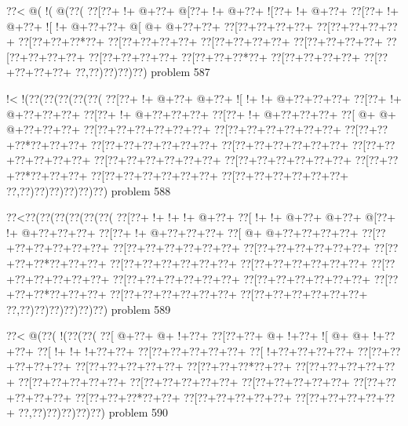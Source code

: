 \vbox{\vbox{\goo
\0??<\- @(\- !(\- @(\0??(
\0??[\0??+\- !+\- @+\0??+
\- @[\0??+\- !+\- @+\0??+
\- ![\0??+\- !+\- @+\0??+
\0??[\0??+\- !+\- @+\0??+
\- ![\- !+\- @+\0??+\0??+
\- @[\- @+\- @+\0??+\0??+
\0??[\0??+\0??+\0??+\0??+
\0??[\0??+\0??+\0??+\0??+
\0??[\0??+\0??+\0??*\0??+
\0??[\0??+\0??+\0??+\0??+
\0??[\0??+\0??+\0??+\0??+
\0??[\0??+\0??+\0??+\0??+
\0??[\0??+\0??+\0??+\0??+
\0??[\0??+\0??+\0??+\0??+
\0??[\0??+\0??+\0??*\0??+
\0??[\0??+\0??+\0??+\0??+
\0??[\0??+\0??+\0??+\0??+
\0??,\0??)\0??)\0??)\0??)
}
\hfil problem 587\hfil\break
}

\vbox{\vbox{\goo
\- !<\- !(\0??(\0??(\0??(\0??(\0??(
\0??[\0??+\- !+\- @+\0??+\- @+\0??+
\- ![\- !+\- !+\- @+\0??+\0??+\0??+
\0??[\0??+\- !+\- @+\0??+\0??+\0??+
\0??[\0??+\- !+\- @+\0??+\0??+\0??+
\0??[\0??+\- !+\- @+\0??+\0??+\0??+
\0??[\- @+\- @+\- @+\0??+\0??+\0??+
\0??[\0??+\0??+\0??+\0??+\0??+\0??+
\0??[\0??+\0??+\0??+\0??+\0??+\0??+
\0??[\0??+\0??+\0??*\0??+\0??+\0??+
\0??[\0??+\0??+\0??+\0??+\0??+\0??+
\0??[\0??+\0??+\0??+\0??+\0??+\0??+
\0??[\0??+\0??+\0??+\0??+\0??+\0??+
\0??[\0??+\0??+\0??+\0??+\0??+\0??+
\0??[\0??+\0??+\0??+\0??+\0??+\0??+
\0??[\0??+\0??+\0??*\0??+\0??+\0??+
\0??[\0??+\0??+\0??+\0??+\0??+\0??+
\0??[\0??+\0??+\0??+\0??+\0??+\0??+
\0??,\0??)\0??)\0??)\0??)\0??)\0??)
}
\hfil problem 588\hfil\break
}

\vbox{\vbox{\goo
\0??<\0??(\0??(\0??(\0??(\0??(\0??(
\0??[\0??+\- !+\- !+\- !+\- @+\0??+
\0??[\- !+\- !+\- @+\0??+\- @+\0??+
\- @[\0??+\- !+\- @+\0??+\0??+\0??+
\0??[\0??+\- !+\- @+\0??+\0??+\0??+
\0??[\- @+\- @+\0??+\0??+\0??+\0??+
\0??[\0??+\0??+\0??+\0??+\0??+\0??+
\0??[\0??+\0??+\0??+\0??+\0??+\0??+
\0??[\0??+\0??+\0??+\0??+\0??+\0??+
\0??[\0??+\0??+\0??*\0??+\0??+\0??+
\0??[\0??+\0??+\0??+\0??+\0??+\0??+
\0??[\0??+\0??+\0??+\0??+\0??+\0??+
\0??[\0??+\0??+\0??+\0??+\0??+\0??+
\0??[\0??+\0??+\0??+\0??+\0??+\0??+
\0??[\0??+\0??+\0??+\0??+\0??+\0??+
\0??[\0??+\0??+\0??*\0??+\0??+\0??+
\0??[\0??+\0??+\0??+\0??+\0??+\0??+
\0??[\0??+\0??+\0??+\0??+\0??+\0??+
\0??,\0??)\0??)\0??)\0??)\0??)\0??)
}
\hfil problem 589\hfil\break
}

\vbox{\vbox{\goo
\0??<\- @(\0??(\- !(\0??(\0??(
\0??[\- @+\0??+\- @+\- !+\0??+
\0??[\0??+\0??+\- @+\- !+\0??+
\- ![\- @+\- @+\- !+\0??+\0??+
\0??[\- !+\- !+\- !+\0??+\0??+
\0??[\0??+\0??+\0??+\0??+\0??+
\0??[\- !+\0??+\0??+\0??+\0??+
\0??[\0??+\0??+\0??+\0??+\0??+
\0??[\0??+\0??+\0??+\0??+\0??+
\0??[\0??+\0??+\0??*\0??+\0??+
\0??[\0??+\0??+\0??+\0??+\0??+
\0??[\0??+\0??+\0??+\0??+\0??+
\0??[\0??+\0??+\0??+\0??+\0??+
\0??[\0??+\0??+\0??+\0??+\0??+
\0??[\0??+\0??+\0??+\0??+\0??+
\0??[\0??+\0??+\0??*\0??+\0??+
\0??[\0??+\0??+\0??+\0??+\0??+
\0??[\0??+\0??+\0??+\0??+\0??+
\0??,\0??)\0??)\0??)\0??)\0??)
}
\hfil problem 590\hfil\break
}

